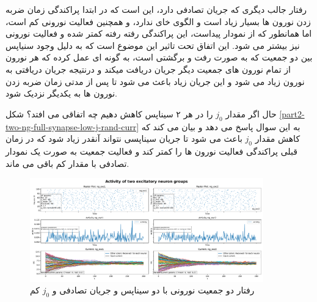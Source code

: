 \documentclass{report}
\begin{document}
            رفتار جالب دیگری که جریان تصادفی دارد، این است که در ابتدا پراکندگی زمان ضربه زدن نورون ها بسیار زیاد است و الگوی خای ندارد، و همچنین فعالیت نورونی کم است، اما همانطور که از نمودار پیداست، این پراکندگی رفته رفته کمتر شده و فعالیت نورونی نیز بیشتر می شود. این اتفاق تحت تاثیر این موضوع است که به دلیل وجود سنیاپس بین دو جمعیت که به صورت رفت و برگشتی است، به گونه ای عمل کرده که هر نورون از تمام نورون های جمعیت دیگر جریان دریافت میکند و درنتیجه جریان دریافتی به نورون زیاد می شود و این جریان زیاد باعث می شود تا پس از مدتی زمان ضربه زدن نورون ها به یکدیگر نزدیک شود.

            حال اگر مقدار 
            $j_0$ 
            را در هر ۲ سیناپس کاهش دهیم چه اتفاقی می افتد؟ شکل 
            \ref{part2-two-ng-full-synapse-low-j-rand-curr}
            به این سوال پاسخ می دهد و بیان می کند که کاهش مقدار 
            $j_0$ 
            باعث می شود تا جریان سیناپسی نتواند آنقدر زیاد شود که در زمان قبلی پراکندگی فعالیت نورون ها را کمتر کند و فعالیت جمعیت به صورت یک نمودار تصادفی با مقدار کم باقی می ماند.
            \begin{figure}[!ht]
                \centering
                \includegraphics[width=0.9\textwidth]{plots/part2-two-ng-full-synapse-low-j-rand-curr.pdf} 
                \caption{رفتار دو جمعیت نورونی با دو سیناپس و جریان تصادفی و $j_0$ کم}
                \label{fig:part2-two-ng-full-synapse-low-j-rand-curr}
            \end{figure}
\end{document}
